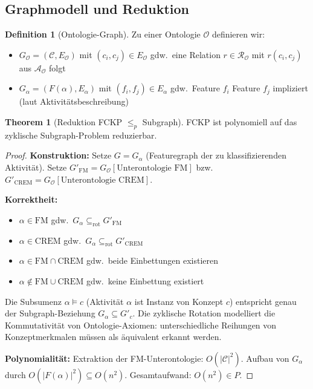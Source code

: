 ﻿\documentclass[a4paper,12pt]{article}
\theoremstyle{definition}
\newtheorem{definition}{Definition}[section]
\newtheorem{theorem}{Theorem}[section]
\begin{document}
\subsection{Graphmodell und Reduktion}

\begin{definition}[Ontologie-Graph]
\label{def:og}
Zu einer Ontologie $\mathcal{O}$ definieren wir:
\begin{itemize}
    \item $G_{\mathcal{O}} = (\mathcal{C}, E_{\mathcal{O}})$ mit $(c_i, c_j) \in E_{\mathcal{O}}$
          gdw.\ eine Relation $r \in \mathcal{R}_{\mathcal{O}}$ mit $r(c_i, c_j)$ aus $\mathcal{A}_{\mathcal{O}}$ folgt
    \item $G_{\alpha} = (F(\alpha), E_{\alpha})$ mit $(f_i, f_j) \in E_{\alpha}$
          gdw.\ Feature $f_i$ Feature $f_j$ impliziert (laut Aktivitätsbeschreibung)
\end{itemize}
\end{definition}

\begin{theorem}[Reduktion FCKP $\leq_p$ Subgraph]
\label{thm:fckp-red}
FCKP ist polynomiell auf das zyklische Subgraph-Problem reduzierbar.
\end{theorem}

\begin{proof}
\textbf{Konstruktion:}
Setze $G = G_{\alpha}$ (Featuregraph der zu klassifizierenden Aktivität).
Setze $G'_{\mathrm{FM}} = G_{\mathcal{O}}[\text{Unterontologie FM}]$ bzw.\
$G'_{\mathrm{CREM}} = G_{\mathcal{O}}[\text{Unterontologie CREM}]$.

\textbf{Korrektheit:}
\begin{itemize}
    \item $\alpha \in \mathrm{FM}$ gdw.\ $G_{\alpha} \subseteq_{\mathrm{rot}} G'_{\mathrm{FM}}$
    \item $\alpha \in \mathrm{CREM}$ gdw.\ $G_{\alpha} \subseteq_{\mathrm{rot}} G'_{\mathrm{CREM}}$
    \item $\alpha \in \mathrm{FM} \cap \mathrm{CREM}$ gdw.\ beide Einbettungen existieren
    \item $\alpha \notin \mathrm{FM} \cup \mathrm{CREM}$ gdw.\ keine Einbettung existiert
\end{itemize}
Die Subsumenz $\alpha \models c$ (Aktivität $\alpha$ ist Instanz von Konzept $c$)
entspricht genau der Subgraph-Beziehung $G_{\alpha} \subseteq G'_c$.
Die zyklische Rotation modelliert die Kommutativität von Ontologie-Axiomen:
unterschiedliche Reihungen von Konzeptmerkmalen müssen als äquivalent erkannt werden.

\textbf{Polynomialität:}
Extraktion der FM-Unterontologie: $O(|\mathcal{C}|^2)$.
Aufbau von $G_{\alpha}$ durch $O(|F(\alpha)|^2) \subseteq O(n^2)$.
Gesamtaufwand: $O(n^2) \in P$.
\end{proof}
\end{document}

